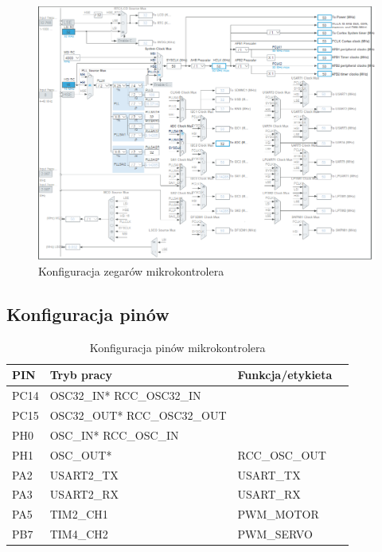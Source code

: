 \documentclass[10pt, a4paper]{article}
\begin{document}
\newpage
\begin{figure}[H]
	\centering
	\includegraphics[width=0.9\textheight,angle=90]{figures/zegar.png}
	\caption{Konfiguracja zegarów mikrokontrolera}
	\label{fig:KonfiguracjaZegara}
\end{figure}

\subsection{Konfiguracja pinów}

\begin{table}[H]
	\centering
	\begin{tabular}{|l|l|l|l|}
		\hline
		PIN & Tryb pracy & Funkcja/etykieta\\
		\hline
		PC14 & OSC32\_IN*	RCC\_OSC32\_IN	&\\
		PC15 & OSC32\_OUT*	RCC\_OSC32\_OUT	&\\
		PH0&  OSC\_IN*	RCC\_OSC\_IN	&\\
		PH1&  OSC\_OUT*&		RCC\_OSC\_OUT	\\
		PA2&	USART2\_TX&	USART\_TX\\
		PA3&	USART2\_RX&	USART\_RX\\
		PA5&	TIM2\_CH1&	PWM\_MOTOR\\
		PB7&    TIM4\_CH2&	PWM\_SERVO\\
		
		
		\hline
	\end{tabular}
	\caption{Konfiguracja pinów mikrokontrolera}
\end{table}
\end{document}
